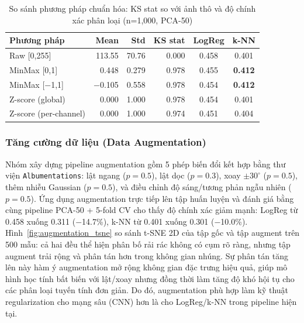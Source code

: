 \begin{table}[H]
    \centering
    \begin{tabular}{|l|r|r|r|c|c|}
        \hline
        \textbf{Phương pháp}  & \textbf{Mean} & \textbf{Std} & \textbf{KS stat} & \textbf{LogReg} & \textbf{k-NN}  \\
        \hline
        Raw [0,255]           & 113.55        & 70.76        & 0.000            & 0.458           & 0.401          \\
        \hline
        MinMax [0,1]          & 0.448         & 0.279        & 0.978            & 0.455           & \textbf{0.412} \\
        \hline
        MinMax [$-$1,1]       & $-$0.105      & 0.558        & 0.978            & 0.454           & \textbf{0.412} \\
        \hline
        Z-score (global)      & 0.000         & 1.000        & 0.978            & 0.454           & 0.401          \\
        \hline
        Z-score (per-channel) & 0.000         & 1.000        & 0.974            & 0.451           & 0.404          \\
        \hline
    \end{tabular}
    \caption{So sánh phương pháp chuẩn hóa: KS stat so với ảnh thô và độ chính xác phân loại (n=1{,}000, PCA-50)}
    \label{tab:normalization_ablation}
\end{table}

\subsubsection{Tăng cường dữ liệu (Data Augmentation)}

Nhóm xây dựng pipeline augmentation gồm 5 phép biến đổi kết hợp bằng thư viện \texttt{Albumentations}: lật ngang ($p=0.5$), lật dọc ($p=0.3$), xoay $\pm 30^\circ$ ($p=0.5$), thêm nhiễu Gaussian ($p=0.5$), và điều chỉnh độ sáng/tương phản ngẫu nhiên ($p=0.5$). Ứng dụng augmentation trực tiếp lên tập huấn luyện và đánh giá bằng cùng pipeline PCA-50 + 5-fold CV cho thấy độ chính xác giảm mạnh: LogReg từ 0.458 xuống 0.311 ($-$14.7\%), k-NN từ 0.401 xuống 0.301 ($-$10.0\%). Hình~\ref{fig:augmentation_tsne} so sánh t-SNE 2D của tập gốc và tập augment trên 500 mẫu: cả hai đều thể hiện phân bố rải rác không có cụm rõ ràng, nhưng tập augment trải rộng và phân tán hơn trong không gian nhúng. Sự phân tán tăng lên này hàm ý augmentation mở rộng không gian đặc trưng hiệu quả, giúp mô hình học tính bất biến với lật/xoay nhưng đồng thời làm tăng độ khó hội tụ cho các phân loại tuyến tính đơn giản. Do đó, augmentation phù hợp làm kỹ thuật regularization cho mạng sâu (CNN) hơn là cho LogReg/k-NN trong pipeline hiện tại.

